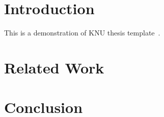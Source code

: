 \documentclass[b5paper,11pt,oneside,openany,article,no-math]{memoir}
\begin{document}
\frontmatter

\maketitle
\makeapproval

\setcounter{page}{1}

\clearpage
\tableofcontents*
\clearpage
\listoffigures*
\clearpage
\listoftables*

\hypersetup{linkcolor=red}
\mainmatter


\clearpage
\chapter{Introduction}

This is a demonstration of KNU thesis template~\cite{knuthesis2015}.

\clearpage
\chapter{Related Work}

\clearpage
\chapter{Conclusion}
% 
% 
% 
% 
% 
% 

\clearpage
\appendix

\backmatter



\clearpage
{}
\end{document}
